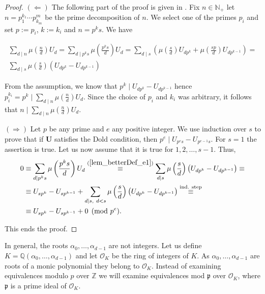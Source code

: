 \documentclass[preprint,12pt]{elsarticle}
\newcommand{\N}{\mathbb{N}}
\newcommand{\Z}{\mathbb{Z}}
\newcommand{\Q}{\mathbb{Q}}
\newcommand{\OO}{\mathcal{O}}
\newcommand{\alphas}{\alpha_0,\ldots,\alpha_{d-1}}
\newcommand{\pp}{\mathfrak{p} }
\begin{document}
  
\begin{proof}
  
    $(\Leftarrow)$
    The following part of the proof is given in \cite{Fibonacci}. Fix $n\in \N_+$ let $n=p_1^{k_1}\cdots p^m_{k_m}$ be the prime decomposition of $n$. We select one of the primes $p_i$ and set $p:=p_i$, $k:=k_i$ and $n=p^ks$. We have
      
    \begin{equation}
    \begin{split}
        \sum_{d\mid n} \mu \left(\frac{n}{d}\right)U_{d} = 
        \sum_{d\mid p^ks} \mu \left(\frac{p^ks}{d}\right)U_{d} =
        \sum_{d\mid s}\left( \mu\left(\frac{s}{d}\right)U_{dp^k} + \mu\left(\frac{sp}{d}\right)U_{dp^{k-1}} \right) = \label{lem_betterDef_e1}\\
        \sum_{d\mid s} \mu\left(\frac{s}{d}\right) \left(U_{dp^k} -U_{dp^{k-1}} \right) 
    \end{split}
   \end{equation}
         
    From the assumption, we know that $p^k\mid U_{dp^k} -U_{dp^{k-1}}$ hence $p_i^{k_i}= p^k\mid\sum_{d\mid n} \mu \left(\frac{n}{d}\right)U_{d} $. Since the choice of $p_i$ and $k_i$ was arbitrary, it follows that  $n\mid\sum_{d\mid n} \mu \left(\frac{n}{d}\right)U_{d} $.

  
   
  
    $(\Rightarrow)$
    Let $p$ be any prime and $e$ any positive integer. We use induction over $s$ to prove that if $\mathbf U$ satisfies the Dold condition, then $p^e\mid U_{p^es}-U_{p^{e-1}s}$. For $s=1$ the assertion is true. Let us now assume that it is true for $1,2,\ldots,s-1$. Thus,
    \begin{align}
        0 &\equiv 
        \sum_{d\mid p^ks} \mu \left(\frac{p^ks}{d}\right)U_{d} \overset{(\ref{lem_betterDef_e1})}{\equiv}
        \sum_{d\mid s} \mu\left(\frac{s}{d}\right) \left(U_{dp^k} -U_{dp^{k-1}} \right) \equiv \\ &\equiv
        U_{sp^k} -U_{sp^{k-1}} + \sum_{d\mid s,\ d<s} \mu\left(\frac{s}{d}\right) \left(U_{dp^k} -U_{dp^{k-1}} \right) \overset{\text{ind. step}}{\equiv} \\ &\equiv
        U_{sp^k} -U_{sp^{k-1}} + 0 \pmod {p^e}.
    \end{align}

    This ends the proof.
  
\end{proof}


In general, the roots $\alphas$ are not integers. Let us define $K=\Q(\alphas)$ and let $\OO_K$ be the ring of integers of $K$. As $\alphas$ are roots of a monic polynomial they belong to $\OO_K$. Instead of examining equivalences modulo $p$ over $\Z$ we will examine equivalences mod $\pp$ over $\OO_K$, where $\pp$ is a prime ideal of $\OO_K$. 
\end{document}
